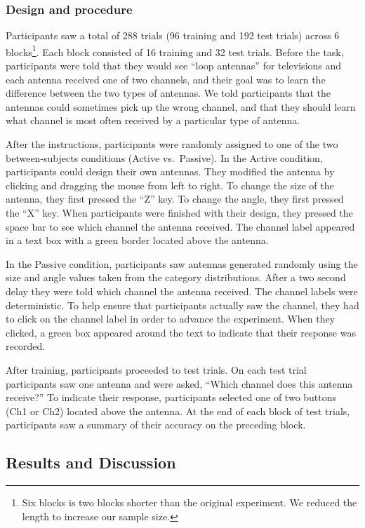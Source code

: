 \documentclass[10pt, letterpaper]{article}
\begin{document}
\subsubsection{Design and procedure}\label{design-and-procedure}

Participants saw a total of 288 trials (96 training and 192 test trials)
across 6
blocks\footnote{Six blocks is two blocks shorter than the original experiment. We reduced the length to increase our sample size.}.
Each block consisted of 16 training and 32 test trials. Before the task,
participants were told that they would see ``loop antennas'' for
televisions and each antenna received one of two channels, and their
goal was to learn the difference between the two types of antennas. We
told participants that the antennas could sometimes pick up the wrong
channel, and that they should learn what channel is most often received
by a particular type of antenna.

After the instructions, participants were randomly assigned to one of
the two between-subjects conditions (Active vs.~Passive). In the Active
condition, participants could design their own antennas. They modified
the antenna by clicking and dragging the mouse from left to right. To
change the size of the antenna, they first pressed the ``Z'' key. To
change the angle, they first pressed the ``X'' key. When participants
were finished with their design, they pressed the space bar to see which
channel the antenna received. The channel label appeared in a text box
with a green border located above the antenna.

In the Passive condition, participants saw antennas generated randomly
using the size and angle values taken from the category distributions.
After a two second delay they were told which channel the antenna
received. The channel labels were deterministic. To help ensure that
participants actually saw the channel, they had to click on the channel
label in order to advance the experiment. When they clicked, a green box
appeared around the text to indicate that their response was recorded.

After training, participants proceeded to test trials. On each test
trial participants saw one antenna and were asked, ``Which channel does
this antenna receive?'' To indicate their response, participants
selected one of two buttons (Ch1 or Ch2) located above the antenna. At
the end of each block of test trials, participants saw a summary of
their accuracy on the preceding block.

\subsection{Results and Discussion}\label{results-and-discussion}
\end{document}
